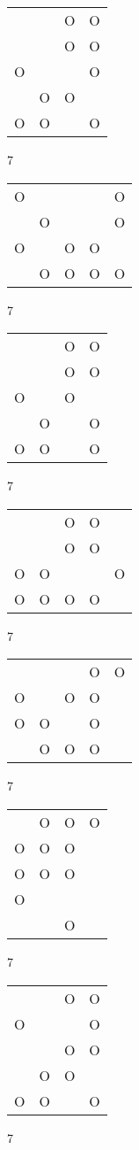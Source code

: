 \begin{tabular}{|m{0.2cm}m{0.2cm}m{0.2cm}m{0.2cm}|}\hline
 & &O&O\\
 & &O&O\\
O& & &O\\
 &O&O& \\
O&O& &O\\
\hline\end{tabular}7
\begin{tabular}{|m{0.2cm}m{0.2cm}m{0.2cm}m{0.2cm}m{0.2cm}|}\hline
O& & & &O\\
 &O& & &O\\
O& &O&O& \\
 &O&O&O&O\\
\hline\end{tabular}7
\begin{tabular}{|m{0.2cm}m{0.2cm}m{0.2cm}m{0.2cm}|}\hline
 & &O&O\\
 & &O&O\\
O& &O& \\
 &O& &O\\
O&O& &O\\
\hline\end{tabular}7
\begin{tabular}{|m{0.2cm}m{0.2cm}m{0.2cm}m{0.2cm}m{0.2cm}|}\hline
 & &O&O& \\
 & &O&O& \\
O&O& & &O\\
O&O&O&O& \\
\hline\end{tabular}7
\begin{tabular}{|m{0.2cm}m{0.2cm}m{0.2cm}m{0.2cm}m{0.2cm}|}\hline
 & & &O&O\\
O& &O&O& \\
O&O& &O& \\
 &O&O&O& \\
\hline\end{tabular}7
\begin{tabular}{|m{0.2cm}m{0.2cm}m{0.2cm}m{0.2cm}|}\hline
 &O&O&O\\
O&O&O& \\
O&O&O& \\
O& & & \\
 & &O& \\
\hline\end{tabular}7
\begin{tabular}{|m{0.2cm}m{0.2cm}m{0.2cm}m{0.2cm}|}\hline
 & &O&O\\
O& & &O\\
 & &O&O\\
 &O&O& \\
O&O& &O\\
\hline\end{tabular}7
